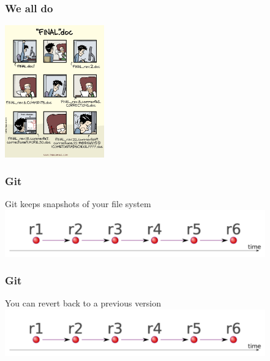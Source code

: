 \documentclass{beamer}
\begin{document}
\begin{frame}
\frametitle{We all do}
 \includegraphics[height=5.7cm]{figures/vcs_for_science.png}
\end{frame}




\begin{frame}
\frametitle{Git}
Git keeps snapshots of your file system
\includegraphics[height=2cm]{figures/git1.pdf}
\end{frame}

\begin{frame}
\frametitle{Git}
You can revert back to a previous version
\includegraphics[height=2cm]{figures/git1.pdf}
\end{frame}
\end{document}

